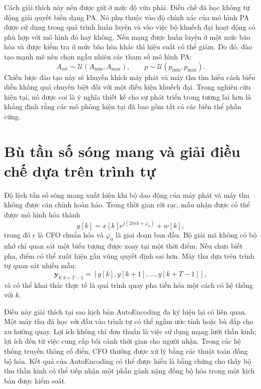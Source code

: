 Cách giải thích này nên được giữ ở mức độ vừa phải. Điều chế đã học không tự động giải quyết biến dạng PA. Nó phụ thuộc vào độ chính xác của mô hình PA được sử dụng trong quá trình huấn luyện và vào việc bộ khuếch đại hoạt động có phù hợp với mô hình đó hay không. Nếu mạng được huấn luyện ở một mức bão hòa và được kiểm tra ở mức bão hòa khác thì hiệu suất có thể giảm. Do đó, đào tạo mạnh mẽ nên chọn ngẫu nhiên các tham số mô hình PA:
\begin{equation}
  A_{\mathrm{sat}}\sim\mathcal{U}(A_{\min},A_{\max}), \qquad
  p\sim\mathcal{U}(p_{\min},p_{\max}).
\end{equation}
Chiến lược đào tạo này sẽ khuyến khích máy phát và máy thu tìm hiểu cách biểu diễn không quá chuyên biệt đối với một điều kiện khuếch đại. Trong nghiên cứu hiện tại, nó được coi là ý nghĩa thiết kế cho sự phát triển trong tương lai hơn là khẳng định rằng các mô phỏng hiện tại đã bao gồm tất cả các biến thể phần cứng.

\section{Bù tần số sóng mang và giải điều chế dựa trên trình tự}
Độ lệch tần số sóng mang xuất hiện khi bộ dao động của máy phát và máy thu không được căn chỉnh hoàn hảo. Trong thời gian rời rạc, mẫu nhận được có thể được mô hình hóa thành
\begin{equation}
  y[k]=x[k]e^{j(2\pi\epsilon k+\varphi_0)}+w[k],
\end{equation}
trong đó $\epsilon$ là CFO chuẩn hóa và $\varphi_0$ là giai đoạn ban đầu. Bộ giải mã không có bộ nhớ chỉ quan sát một biểu tượng được xoay tại một thời điểm. Nếu chưa biết pha, điểm có thể xuất hiện gần vùng quyết định sai hơn. Máy thu dựa trên trình tự quan sát nhiều mẫu:
\begin{equation}
  \mathbf{y}_{k:k+T-1}=[y[k],y[k+1],\ldots,y[k+T-1]],
\end{equation}
và có thể khai thác thực tế là quá trình quay pha tiến hóa một cách có hệ thống với $k$.

Điều này giải thích tại sao kịch bản AutoEncoding đa ký hiệu lại có liên quan. Một máy thu đã học với đầu vào trình tự có thể ngầm ước tính hoặc bù đắp cho xu hướng quay. Lợi ích không chỉ đơn thuần là việc sử dụng mạng lưới thần kinh; lợi ích đến từ việc cung cấp bối cảnh thời gian cho người nhận. Trong các hệ thống truyền thông cổ điển, CFO thường được xử lý bằng các thuật toán đồng bộ hóa. Kết quả của AutoEncoding có thể được hiểu là bằng chứng cho thấy bộ thu thần kinh có thể tiếp nhận một phần gánh nặng đồng bộ hóa trong một kịch bản được kiểm soát.

